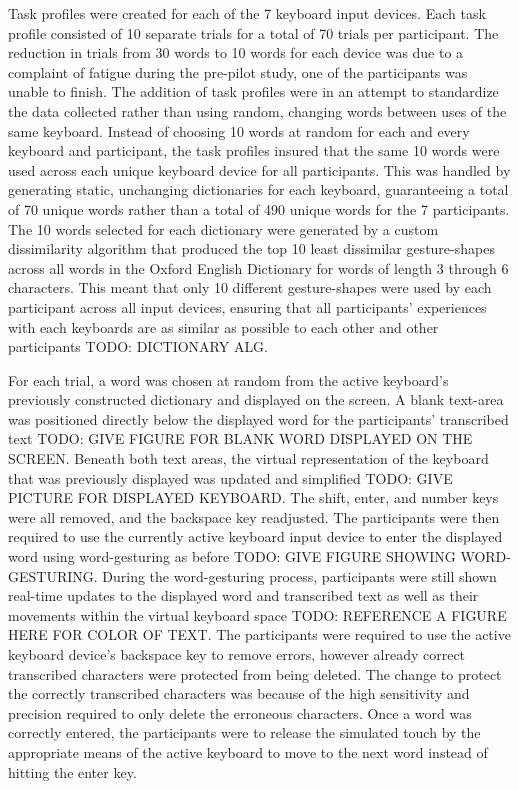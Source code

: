 Task profiles were created for each of the 7 keyboard input devices. Each task profile consisted of 10 separate trials for a total of 70 trials per participant. The reduction in trials from 30 words to 10 words for each device was due to a complaint of fatigue during the pre-pilot study, one of the participants was unable to finish. The addition of task profiles were in an attempt to standardize the data collected rather than using random, changing words between uses of the same keyboard. Instead of choosing 10 words at random for each and every keyboard and participant, the task profiles insured that the same 10 words were used across each unique keyboard device for all participants. This was handled by generating static, unchanging dictionaries for each keyboard, guaranteeing a total of 70 unique words rather than a total of 490 unique words for the 7 participants. The 10 words selected for each dictionary were generated by a custom dissimilarity algorithm that produced the top 10 least dissimilar gesture-shapes across all words in the Oxford English Dictionary for words of length 3 through 6 characters. This meant that only 10 different gesture-shapes were used by each participant across all input devices, ensuring that all participants' experiences with each keyboards are as similar as possible to each other and other participants TODO: DICTIONARY ALG.

For each trial, a word was chosen at random from the active keyboard's previously constructed dictionary and displayed on the screen. A blank text-area was positioned directly below the displayed word for the participants' transcribed text TODO: GIVE FIGURE FOR BLANK WORD DISPLAYED ON THE SCREEN. Beneath both text areas, the virtual representation of the keyboard that was previously displayed was updated and simplified TODO: GIVE PICTURE FOR DISPLAYED KEYBOARD. The shift, enter, and number keys were all removed, and the backspace key readjusted. The participants were then required to use the currently active keyboard input device to enter the displayed word using word-gesturing as before TODO: GIVE FIGURE SHOWING WORD-GESTURING. During the word-gesturing process, participants were still shown real-time updates to the displayed word and transcribed text as well as their movements within the virtual keyboard space TODO: REFERENCE A FIGURE HERE FOR COLOR OF TEXT. The participants were required to use the active keyboard device's backspace key to remove errors, however already correct transcribed characters were protected from being deleted. The change to protect the correctly transcribed characters was because of the high sensitivity and precision required to only delete the erroneous characters. Once a word was correctly entered, the participants were to release the simulated touch by the appropriate means of the active keyboard to move to the next word instead of hitting the enter key.

